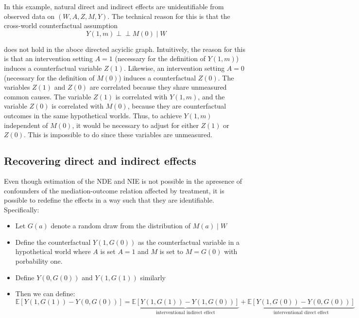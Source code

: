\documentclass[
  12pt,
]{book}
\providecommand{\tightlist}{%
  \setlength{\itemsep}{0pt}\setlength{\parskip}{0pt}}
\theoremstyle{definition}
\theoremstyle{definition}
\theoremstyle{definition}
\newcommand{\indep}{\mbox{$\perp\!\!\!\perp$}}
\newcommand{\E}{\mathbb{E}}
\newcommand{\1}{\mathbbm{1}}
\begin{document}
In this example, natural direct and indirect effects are
unidentifiable from observed data on \((W,A,Z,M,Y)\). The technical
reason for this is that the cross-world counterfactual assumption
\begin{equation*}
  Y(1,m)\indep M(0)\mid W
\end{equation*}

does not hold in the aboce directed acyiclic graph. Intuitively, the
reason for this is that an intervention setting \(A=1\) (necessary for
the definition of \(Y(1,m)\)) induces a counterfactual variable
\(Z(1)\). Likewise, an intervention setting \(A=0\) (necessary for the
definition of \(M(0)\)) induces a counterfactual \(Z(0)\). The variables
\(Z(1)\) and \(Z(0)\) are correlated because they share unmeasured common
causes. The variable \(Z(1)\) is correlated with \(Y(1,m)\), and the
variable \(Z(0)\) is correlated with \(M(0)\), because they are
counterfactual outcomes in the same hypothetical worlds. Thus, to
achieve \(Y(1,m)\) independent of \(M(0)\), it would be necessary to
adjust for either \(Z(1)\) or \(Z(0)\). This is impossible to do since
these variables are unmeasured.

\hypertarget{recovering-direct-and-indirect-effects}{%
\subsection{Recovering direct and indirect effects}\label{recovering-direct-and-indirect-effects}}

Even though estimation of the NDE and NIE is not possible in the
apresence of confounders of the mediation-outcome relation affected by
treatment, it is possible to redefine the effects in a way such that
they are identifiable. Specifically:

\begin{itemize}
\tightlist
\item
  Let \(G(a)\) denote a random draw from the distribution of \(M(a) \mid W\)
\item
  Define the counterfactual \(Y(1,G(0))\) as the counterfactual
  variable in a hypothetical world where \(A\) is set \(A=1\) and \(M\) is
  set to \(M=G(0)\) with porbability one.
\item
  Define \(Y(0,G(0))\) and \(Y(1,G(1))\) similarly
\item
  Then we can define:
  \begin{equation*}
    \E[Y(1,G(1)) - Y(0,G(0))] = \underbrace{\E[Y(1,G(1)) -
      Y(1,G(0))]}_{\text{interventional indirect effect}} +
      \underbrace{\E[Y(1,G(0)) -
      Y(0,G(0))]}_{\text{interventional direct effect}}
  \end{equation*}
\end{itemize}
\end{document}
